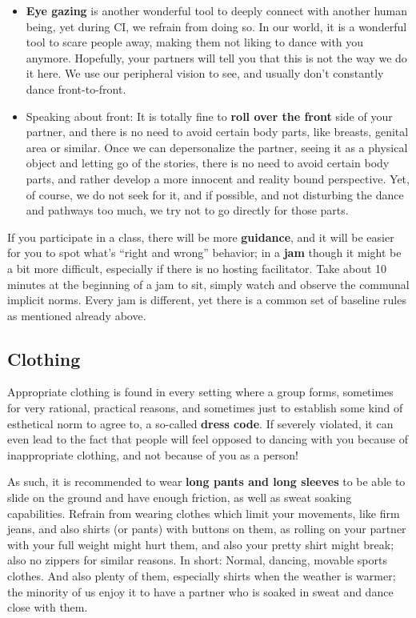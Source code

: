 \begin{itemize}
    \item \textbf{Eye gazing} is another wonderful tool to deeply connect with another human being, yet during CI, we refrain from doing so.
    In our world, it is a wonderful tool to scare people away, making them not liking to dance with you anymore.
    Hopefully, your partners will tell you that this is not the way we do it here.
    We use our peripheral vision to see, and usually don't constantly dance front-to-front.
    \item Speaking about front: It is totally fine to \textbf{roll over the front} side of your partner, and there is no need to avoid certain body parts, like breasts, genital area or similar.
    Once we can depersonalize the partner, seeing it as a physical object and letting go of the stories, there is no need to avoid certain body parts, and rather develop a more innocent and reality bound perspective.
    Yet, of course, we do not seek for it, and if possible, and not disturbing the dance and pathways too much, we try not to go directly for those parts.
\end{itemize}

If you participate in a class, there will be more \textbf{guidance}, and it will be easier for you to spot what's ``right and wrong'' behavior; in a \textbf{jam} though it might be a bit more difficult, especially if there is no hosting facilitator.
Take about 10 minutes at the beginning of a jam to sit, simply watch and observe the communal implicit norms.
Every jam is different, yet there is a common set of baseline rules as mentioned already above.

\subsection{Clothing}\label{subsec:clothing}

Appropriate clothing is found in every setting where a group forms, sometimes for very rational, practical reasons, and sometimes just to establish some kind of esthetical norm to agree to, a so-called \textbf{dress code}.
If severely violated, it can even lead to the fact that people will feel opposed to dancing with you because of inappropriate clothing, and not because of you as a person!

As such, it is recommended to wear \textbf{long pants and long sleeves} to be able to slide on the ground and have enough friction, as well as sweat soaking capabilities.
Refrain from wearing clothes which limit your movements, like firm jeans, and also shirts (or pants) with buttons on them, as rolling on your partner with your full weight might hurt them, and also your pretty shirt might break; also no zippers for similar reasons.
In short: Normal, dancing, movable sports clothes.
And also plenty of them, especially shirts when the weather is warmer; the minority of us enjoy it to have a partner who is soaked in sweat and dance close with them.

